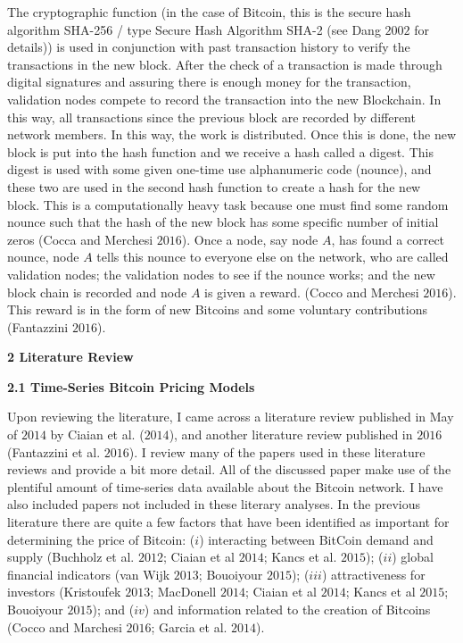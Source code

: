 \documentclass{article}[10 pt]
\newcommand{\vs}{\vspace{0.1in}}
\begin{document}
\vs

The cryptographic function (in the case of Bitcoin, this is the secure hash
algorithm SHA-256 / type Secure Hash Algorithm SHA-2 (see Dang $2002$ for
details)) is used in conjunction with past transaction history to verify the transactions
in the new block. After the check of a transaction is made through digital
signatures and assuring there is enough money for the transaction,
validation nodes compete to record the transaction into the new Blockchain.
In this way, all transactions since the previous block are recorded by
different network members. In this way, the work is distributed. 
Once this is done, the new block is put into the
hash function and we receive a hash called a digest. This digest is used
with some given one-time use alphanumeric code (nounce), and these two are
used in the second hash function to create a hash for the new block. This is
a computationally heavy task because one must find some random nounce such
that the hash of the new block has some specific number of initial zeros
(Cocca and Merchesi $2016$). Once a node, say node $A$, has found a correct 
nounce, node $A$ tells this nounce to everyone else on the network, who are 
called validation nodes; the validation nodes to see if the nounce works; and 
the new block chain is recorded and node $A$ is given a reward. 
(Cocco and Merchesi $2016$). This reward is in the form of new Bitcoins and 
some voluntary contributions (Fantazzini $2016$).  

\vs

\textbf{2 Literature Review}

\vs

\textbf{2.1 Time-Series Bitcoin Pricing Models}

\vs

Upon reviewing the literature, I came across a literature review published
in May of $2014$ by Ciaian et al. ($2014$), and another literature review
published in $2016$ (Fantazzini et al. $2016$). I review many of the papers
used in these literature reviews and provide a bit more detail. All of the
discussed paper make use of the plentiful amount of time-series data
available about the Bitcoin network. I have also
included papers not included in these literary analyses. In the previous
literature there are quite a few factors that have been identified as
important for determining the price of Bitcoin: ($i$) interacting between
BitCoin demand and supply (Buchholz et al. $2012$; Ciaian et al $2014$;
Kancs et al. $2015$);
($ii$) global financial indicators (van Wijk $2013$; Bouoiyour $2015$); ($iii$)
attractiveness for investors (Kristoufek $2013$; MacDonell $2014$; Ciaian et
al $2014$; Kancs et al $2015$; Bouoiyour $2015$); and ($iv$) and information
related to the creation of Bitcoins (Cocco and Marchesi $2016$; Garcia et
al. $2014$).
\end{document}
